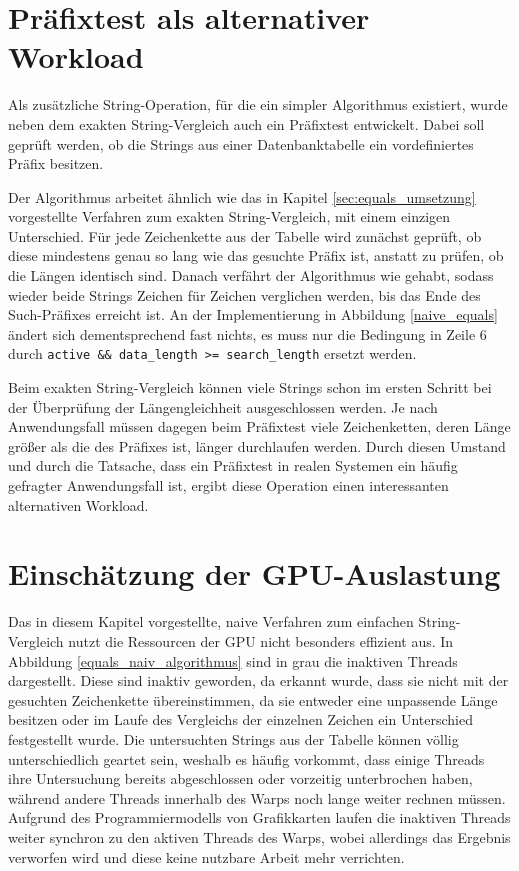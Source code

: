 \section{Präfixtest als alternativer Workload}
\label{sec:prefixtest}

Als zusätzliche String-Operation, für die ein simpler Algorithmus existiert, wurde neben dem exakten String-Vergleich auch ein Präfixtest entwickelt.
Dabei soll geprüft werden, ob die Strings aus einer Datenbanktabelle ein vordefiniertes Präfix besitzen.

Der Algorithmus arbeitet ähnlich wie das in Kapitel \ref{sec:equals_umsetzung} vorgestellte Verfahren zum exakten String-Vergleich, mit einem einzigen Unterschied.
Für jede Zeichenkette aus der Tabelle wird zunächst geprüft, ob diese mindestens genau so lang wie das gesuchte Präfix ist, anstatt zu prüfen, ob die Längen identisch sind.
Danach verfährt der Algorithmus wie gehabt, sodass wieder beide Strings Zeichen für Zeichen verglichen werden, bis das Ende des Such-Präfixes erreicht ist.
An der Implementierung in Abbildung \ref{naive_equals} ändert sich dementsprechend fast nichts, es muss nur die Bedingung in Zeile 6 durch \texttt{active \&\& data\_length >= search\_length} ersetzt werden.

Beim exakten String-Vergleich können viele Strings schon im ersten Schritt bei der Überprüfung der Längengleichheit ausgeschlossen werden.
Je nach Anwendungsfall müssen dagegen beim Präfixtest viele Zeichenketten, deren Länge größer als die des Präfixes ist, länger durchlaufen werden.
Durch diesen Umstand und durch die Tatsache, dass ein Präfixtest in realen Systemen ein häufig gefragter Anwendungsfall ist, ergibt diese Operation einen interessanten alternativen Workload.

\section{Einschätzung der GPU-Auslastung}
\label{sec:unterauslastung_problem}

Das in diesem Kapitel vorgestellte, naive Verfahren zum einfachen String-Vergleich nutzt die Ressourcen der GPU nicht besonders effizient aus.
In Abbildung \ref{equals_naiv_algorithmus} sind in grau die inaktiven Threads dargestellt.
Diese sind inaktiv geworden, da erkannt wurde, dass sie nicht mit der gesuchten Zeichenkette übereinstimmen, da sie entweder eine unpassende Länge besitzen oder im Laufe des Vergleichs der einzelnen Zeichen ein Unterschied festgestellt wurde.
Die untersuchten Strings aus der Tabelle können völlig unterschiedlich geartet sein, weshalb es häufig vorkommt, dass einige Threads ihre Untersuchung bereits abgeschlossen oder vorzeitig unterbrochen haben, während andere Threads innerhalb des Warps noch lange weiter rechnen müssen.
Aufgrund des Programmiermodells von Grafikkarten laufen die inaktiven Threads weiter synchron zu den aktiven Threads des Warps, wobei allerdings das Ergebnis verworfen wird und diese keine nutzbare Arbeit mehr verrichten.

